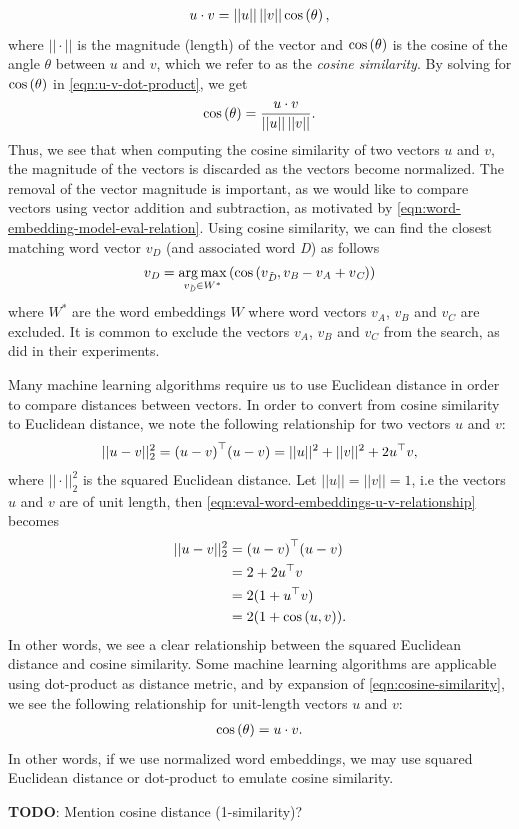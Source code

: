 \begin{align}
    u \cdot v = ||u||\,||v|| \cos\left(\theta\right),
    \label{eqn:u-v-dot-product}
\end{align}
where $||\cdot||$ is the magnitude (length) of the vector and $\cos \left(\theta\right)$ is the cosine of the angle $\theta$ between $u$ and $v$, which we refer to as the \textit{cosine similarity}. By solving for $\cos \left(\theta\right)$ in \cref{eqn:u-v-dot-product}, we get
\begin{align}
    \cos\left(\theta\right) = \frac{u \cdot v}{||u||\,||v||}.
    \label{eqn:cosine-similarity}
\end{align}
Thus, we see that when computing the cosine similarity of two vectors $u$ and $v$, the magnitude of the vectors is discarded as the vectors become normalized. The removal of the vector magnitude is important, as we would like to compare vectors using vector addition and subtraction, as motivated by \cref{eqn:word-embedding-model-eval-relation}. Using cosine similarity, we can find the closest matching word vector $v_{\textit{D}}$ (and associated word \textit{D}) as follows
\begin{align}
    v_{\textit{D}} = \operatorname*{arg\,max}_{v_{\Tilde{\textit{D}}} \in W^*} \left(\cos \left(v_{\Tilde{\textit{D}}}, v_{\textit{B}} - v_{\textit{A}} + v_{\textit{C}}\right)\right)
\end{align}
where $W^*$ are the word embeddings $W$ where word vectors $v_{\textit{A}}$, $v_{\textit{B}}$ and $v_{\textit{C}}$ are excluded. It is common to exclude the vectors $v_{\textit{A}}$, $v_{\textit{B}}$ and $v_{\textit{C}}$ from the search, as \cite{mikolov2013a} did in their experiments.

Many machine learning algorithms require us to use Euclidean distance in order to compare distances between vectors. In order to convert from cosine similarity to Euclidean distance, we note the following relationship for two vectors $u$ and $v$:
\begin{align}
    ||u - v||_2^2 = {(u - v)}^\top (u - v) = ||u||^2 + ||v||^2 + 2{u}^\top v,
    \label{eqn:eval-word-embeddings-u-v-relationship}
\end{align}
where $||\cdot||_2^2$ is the squared Euclidean distance. Let $||u|| = ||v|| = 1$, i.e the vectors $u$ and $v$ are of unit length, then \cref{eqn:eval-word-embeddings-u-v-relationship} becomes
\begin{align}
    ||u - v||_2^2
    &= {(u - v)}^\top (u - v) \\
    &= 2 + 2{u}^\top v \\
    &= 2(1 + {u}^\top v) \\
    &= 2(1 + \cos \left(u, v\right)).
\end{align}
In other words, we see a clear relationship between the squared Euclidean distance and cosine similarity. Some machine learning algorithms are applicable using dot-product as distance metric, and by expansion of \cref{eqn:cosine-similarity}, we see the following relationship for unit-length vectors $u$ and $v$:
\begin{align}
    \cos\left(\theta\right) = u \cdot v.
\end{align}
In other words, if we use normalized word embeddings, we may use squared Euclidean distance or dot-product to emulate cosine similarity.

\textbf{TODO}: Mention cosine distance (1-similarity)?